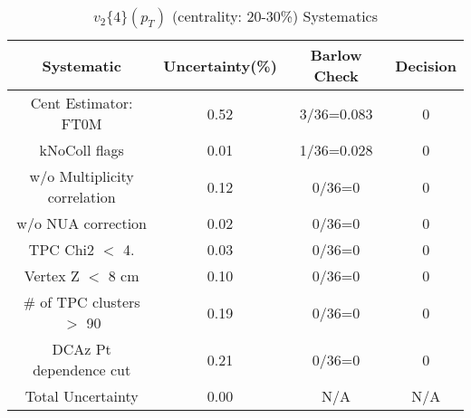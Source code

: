 \begin{table}[htbp]
\caption{$v_2\{4\}(p_{T})$ (centrality: 20-30\%) Systematics}
\label{tab:Sys_pTDiffv24ChFull}
\centering
\begin{tabular}{|c|c|c|c|}
\hline
Systematic & Uncertainty(\%) & Barlow Check & Decision \\
\hline
Cent Estimator: FT0M & 0.52 & 3/36=0.083 & 0 \\
kNoColl flags & 0.01 & 1/36=0.028 & 0 \\
w/o Multiplicity correlation & 0.12 & 0/36=0 & 0 \\
w/o NUA correction & 0.02 & 0/36=0 & 0 \\
TPC Chi2 $<$ 4. & 0.03 & 0/36=0 & 0 \\
Vertex Z $<$ 8 cm & 0.10 & 0/36=0 & 0 \\
\# of TPC clusters $>$ 90 & 0.19 & 0/36=0 & 0 \\
DCAz Pt dependence cut & 0.21 & 0/36=0 & 0 \\
\hline
Total Uncertainty & 0.00 & N/A & N/A \\
\hline
\end{tabular}
\end{table}
